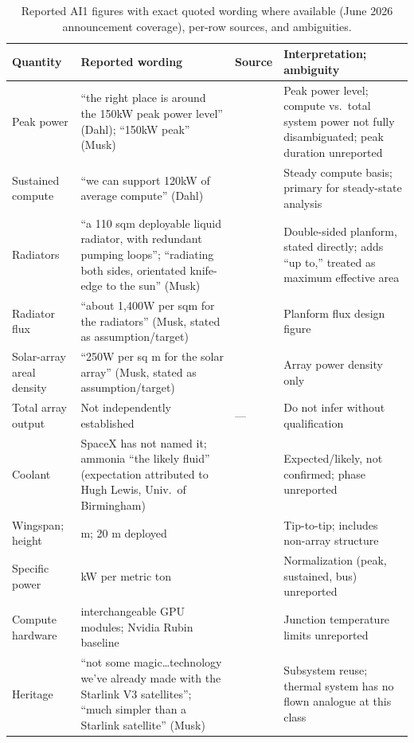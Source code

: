 \documentclass[11pt]{article}
\begin{document}
\begin{table}[h]
\centering
\footnotesize
\begin{tabularx}{\textwidth}{>{\raggedright\arraybackslash}p{2.6cm}>{\raggedright\arraybackslash}p{4.5cm}p{1.1cm}>{\raggedright\arraybackslash}X}
\toprule
Quantity & Reported wording & Source & Interpretation; ambiguity \\
\midrule
Peak power & ``the right place is around the 150kW peak power level'' (Dahl); ``150kW peak'' (Musk) & \cite{dcd2026} & Peak power level; compute vs.\ total system power not fully disambiguated; peak duration unreported \\
Sustained compute & ``we can support 120kW of average compute'' (Dahl) & \cite{dcd2026} & Steady compute basis; primary for steady-state analysis \\
Radiators & ``a 110 sqm deployable liquid radiator, with redundant pumping loops''; ``radiating both sides, orientated knife-edge to the sun'' (Musk) & \cite{dcd2026,toms2026} & Double-sided planform, stated directly; \cite{toms2026} adds ``up to,'' treated as maximum effective area \\
Radiator flux & ``about 1,400W per sqm for the radiators'' (Musk, stated as assumption/target) & \cite{dcd2026} & Planform flux design figure \\
Solar-array areal density & ``250W per sq m for the solar array'' (Musk, stated as assumption/target) & \cite{dcd2026} & Array power density only \\
Total array output & Not independently established & --- & Do not infer without qualification \\
Coolant & SpaceX has not named it; ammonia ``the likely fluid'' (expectation attributed to Hugh Lewis, Univ.\ of Birmingham) & \cite{gagadget2026} & Expected/likely, not confirmed; phase unreported \\
Wingspan; height & 70 m; 20 m deployed & \cite{dcd2026} & Tip-to-tip; includes non-array structure \\
Specific power & 70 kW per metric ton & \cite{toms2026} & Normalization (peak, sustained, bus) unreported \\
Compute hardware & interchangeable GPU modules; Nvidia Rubin baseline & \cite{gagadget2026} & Junction temperature limits unreported \\
Heritage & ``not some magic\ldots technology we've already made with the Starlink V3 satellites''; ``much simpler than a Starlink satellite'' (Musk) & \cite{dcd2026} & Subsystem reuse; thermal system has no flown analogue at this class \\
\bottomrule
\end{tabularx}
\caption{Reported AI1 figures with exact quoted wording where available (June 2026 announcement coverage), per-row sources, and ambiguities.}
\label{tab:specs}
\end{table}
\end{document}
